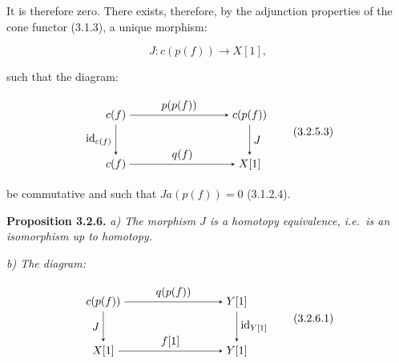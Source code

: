 \clearpage
{}%
It is therefore zero. There exists, therefore, by the adjunction properties
of the cone functor (3.1.3), a unique morphism:

\begin{equation}
  J\colon c(p(f))\longrightarrow X[1],
  \tag{3.2.5.2}
\end{equation}

\noindent such that the diagram:

\begin{equation}
  \begin{tikzpicture}[>=stealth,baseline=(current bounding box.center)]
    \node (Cf1) at (0,1.55) {$c(f)$};
    \node (Cpf) at (4.2,1.55) {$c(p(f))$};
    \node (Cf2) at (0,0) {$c(f)$};
    \node (Xs)  at (4.2,0) {$X[1]$};
    \draw[->] (Cf1) -- node[above] {$p(p(f))$} (Cpf);
    \draw[->] (Cf1) -- node[left] {$\operatorname{id}_{c(f)}$} (Cf2);
    \draw[->] (Cpf) -- node[right] {$J$} (Xs);
    \draw[->] (Cf2) -- node[above] {$q(f)$} (Xs);
  \end{tikzpicture}
  \tag{3.2.5.3}
\end{equation}

\noindent be commutative and such that
$Ja(p(f))=0$ (3.1.2.4).

\noindent\textbf{Proposition 3.2.6.}\quad
{}
\emph{a) The morphism $J$ is a homotopy equivalence, i.e.\ is an
isomorphism up to homotopy.}

\emph{b) The diagram:}

\begin{equation}
  \begin{tikzpicture}[>=stealth,baseline=(current bounding box.center)]
    \node (Cpf) at (0,1.55) {$c(p(f))$};
    \node (Ys1) at (4.2,1.55) {$Y[1]$};
    \node (Xs)  at (0,0) {$X[1]$};
    \node (Ys2) at (4.2,0) {$Y[1]$};
    \draw[->] (Cpf) -- node[above] {$q(p(f))$} (Ys1);
    \draw[->] (Cpf) -- node[left] {$J$} (Xs);
    \draw[->] (Ys1) -- node[right] {$\operatorname{id}_{Y[1]}$} (Ys2);
    \draw[->] (Xs) -- node[above] {$f[1]$} (Ys2);
  \end{tikzpicture}
  \tag{3.2.6.1}
\end{equation}

